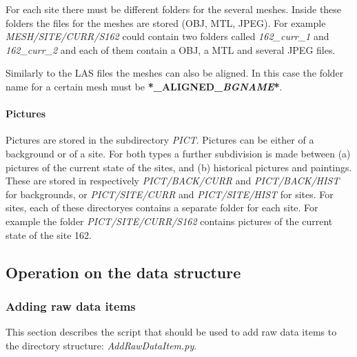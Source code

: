 For each site there must be different folders for the several meshes. Inside these folders the files for the meshes are stored (OBJ, MTL, JPEG). For example \textit{MESH/SITE/CURR/S162} could contain two folders called \textit{162\_curr\_1} and \textit{162\_curr\_2} and each of them contain a OBJ, a MTL and several JPEG files. 

Similarly to the LAS files the meshes can also be aligned. In this case the folder name for a certain mesh must be \textbf{*\_ALIGNED\_\textit{BGNAME}*}. 

\paragraph{Pictures}
Pictures are stored in the subdirectory \textit{PICT}. Pictures can be either of a background or of a site. For both types a further subdivision is made between (a) pictures of the current state of the sites, and (b) historical pictures and paintings. These are stored in respectively \textit{PICT/BACK/CURR} and \textit{PICT/BACK/HIST} for backgrounds, or \textit{PICT/SITE/CURR} and \textit{PICT/SITE/HIST} for sites. For sites, each of these directoryes contains a separate folder for each site. For example the folder \textit{PICT/SITE/CURR/S162} contains pictures of the current state of the site 162.


\subsection{Operation on the data structure}
\subsubsection{Adding raw data items}
This section describes the script that should be used to add raw data items to the directory structure: \textit{AddRawDataItem.py}.

